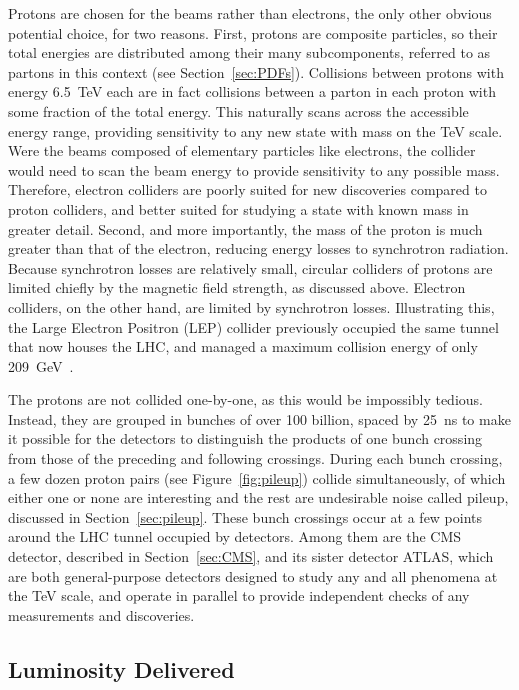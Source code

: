   Protons are chosen for the beams rather than electrons, the only other obvious potential choice, for two reasons.
  First, protons are composite particles, so their total energies are distributed among their many subcomponents, referred to as partons in this context (see Section~\ref{sec:PDFs}).
  Collisions between protons with energy 6.5~TeV each are in fact collisions between a parton in each proton with some fraction of the total energy.
  This naturally scans across the accessible energy range, providing sensitivity to any new state with mass on the TeV scale.
  Were the beams composed of elementary particles like electrons, the collider would need to scan the beam energy to provide sensitivity to any possible mass.
  Therefore, electron colliders are poorly suited for new discoveries compared to proton colliders, and better suited for studying a state with known mass in greater detail.
  Second, and more importantly, the mass of the proton is much greater than that of the electron, reducing energy losses to synchrotron radiation.
  Because synchrotron losses are relatively small, circular colliders of protons are limited chiefly by the magnetic field strength, as discussed above.
  Electron colliders, on the other hand, are limited by synchrotron losses.
  Illustrating this, the Large Electron Positron (LEP) collider previously occupied the same tunnel that now houses the LHC, and managed a maximum collision energy of only 209~GeV~\cite{lep_chargino}.

  The protons are not collided one-by-one, as this would be impossibly tedious.
  Instead, they are grouped in bunches of over 100 billion, spaced by 25~ns to make it possible for the detectors to distinguish the products of one bunch crossing from those of the preceding and following crossings.
  During each bunch crossing, a few dozen proton pairs (see Figure~\ref{fig:pileup}) collide simultaneously, of which either one or none are interesting and the rest are undesirable noise called pileup, discussed in Section~\ref{sec:pileup}.
  These bunch crossings occur at a few points around the LHC tunnel occupied by detectors.
  Among them are the CMS detector, described in Section~\ref{sec:CMS}, and its sister detector ATLAS, which are both general-purpose detectors designed to study any and all phenomena at the TeV scale, and operate in parallel to provide independent checks of any measurements and discoveries.

  \subsection{Luminosity Delivered} \label{sec:lumi}

